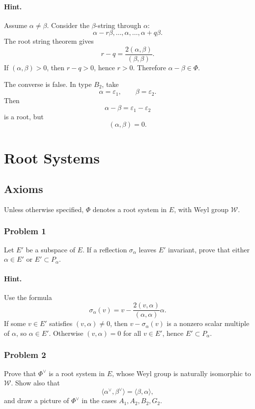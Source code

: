 \documentclass[12pt, a4paper]{article}
\begin{document}
\paragraph{Hint.}
Assume \(\alpha\neq \beta\). Consider the \(\beta\)-string through \(\alpha\):
\[
\alpha-r\beta,\ldots,\alpha,\ldots,\alpha+q\beta.
\]
The root string theorem gives
\[
r-q=\frac{2(\alpha,\beta)}{(\beta,\beta)}.
\]
If \((\alpha,\beta)>0\), then \(r-q>0\), hence \(r>0\). Therefore
\(\alpha-\beta\in \Phi\).

The converse is false. In type \(B_2\), take
\[
\alpha=\varepsilon_1,\qquad \beta=\varepsilon_2.
\]
Then
\[
\alpha-\beta=\varepsilon_1-\varepsilon_2
\]
is a root, but
\[
(\alpha,\beta)=0.
\]

\section{Root Systems}

\subsection{Axioms}

Unless otherwise specified, \(\Phi\) denotes a root system in \(E\), with Weyl
group \(\mathcal W\).

\subsubsection{Problem 1}

Let \(E'\) be a subspace of \(E\). If a reflection \(\sigma_\alpha\) leaves
\(E'\) invariant, prove that either \(\alpha\in E'\) or \(E'\subset P_\alpha\).

\paragraph{Hint.}
Use the formula
\[
\sigma_\alpha(v)=v-\frac{2(v,\alpha)}{(\alpha,\alpha)}\alpha .
\]
If some \(v\in E'\) satisfies \((v,\alpha)\neq 0\), then
\(v-\sigma_\alpha(v)\) is a nonzero scalar multiple of \(\alpha\), so
\(\alpha\in E'\). Otherwise \((v,\alpha)=0\) for all \(v\in E'\), hence
\(E'\subset P_\alpha\).

\subsubsection{Problem 2}

Prove that \(\Phi^\vee\) is a root system in \(E\), whose Weyl group is
naturally isomorphic to \(\mathcal W\). Show also that
\[
\langle \alpha^\vee,\beta^\vee\rangle
=
\langle \beta,\alpha\rangle,
\]
and draw a picture of \(\Phi^\vee\) in the cases \(A_1,A_2,B_2,G_2\).
\end{document}
